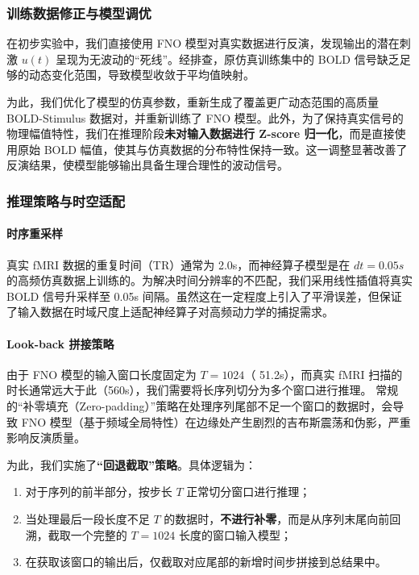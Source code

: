\documentclass[12pt,a4paper]{article}
\begin{document}
\subsubsection{训练数据修正与模型调优}
在初步实验中，我们直接使用 FNO 模型对真实数据进行反演，发现输出的潜在刺激 $u(t)$ 呈现为无波动的“死线”。经排查，原仿真训练集中的 BOLD 信号缺乏足够的动态变化范围，导致模型收敛于平均值映射。

为此，我们优化了模型的仿真参数，重新生成了覆盖更广动态范围的高质量 BOLD-Stimulus 数据对，并重新训练了 FNO 模型。此外，为了保持真实信号的物理幅值特性，我们在推理阶段\textbf{未对输入数据进行 Z-score 归一化}，而是直接使用原始 BOLD 幅值，使其与仿真数据的分布特性保持一致。这一调整显著改善了反演结果，使模型能够输出具备生理合理性的波动信号。

\subsubsection{推理策略与时空适配}
\paragraph{\textbf{时序重采样}}
真实 fMRI 数据的重复时间（TR）通常为 2.0s，而神经算子模型是在 $dt=0.05s$ 的高频仿真数据上训练的。为解决时间分辨率的不匹配，我们采用线性插值将真实 BOLD 信号升采样至 0.05s 间隔。虽然这在一定程度上引入了平滑误差，但保证了输入数据在时域尺度上适配神经算子对高频动力学的捕捉需求。

\paragraph{\textbf{Look-back 拼接策略}}
由于 FNO 模型的输入窗口长度固定为 $T=1024$（ 51.2s），而真实 fMRI 扫描的时长通常远大于此（560s），我们需要将长序列切分为多个窗口进行推理。
常规的“补零填充（Zero-padding）”策略在处理序列尾部不足一个窗口的数据时，会导致 FNO 模型（基于频域全局特性）在边缘处产生剧烈的吉布斯震荡和伪影，严重影响反演质量。

为此，我们实施了\textbf{“回退截取”策略}。具体逻辑为：
\begin{enumerate}
    \item 对于序列的前半部分，按步长 $T$ 正常切分窗口进行推理；
    \item 当处理最后一段长度不足 $T$ 的数据时，\textbf{不进行补零}，而是从序列末尾向前回溯，截取一个完整的 $T=1024$ 长度的窗口输入模型；
    \item 在获取该窗口的输出后，仅截取对应尾部的新增时间步拼接到总结果中。
\end{enumerate}
\end{document}

